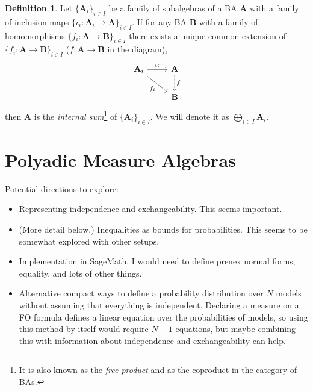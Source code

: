 \documentclass{article}
\theoremstyle{definition}
\newtheorem{definition}{Definition}
\theoremstyle{remark}
\begin{document}
\begin{definition}
  Let $\{ \mathbf{A}_i \}_{i \in I}$ be a family of subalgebras of a BA
  $\mathbf{A}$ with a family of inclusion maps $\{ \iota_i\colon \mathbf{A}_i
  \to \mathbf{A} \}_{i \in I}$. If for any BA $\mathbf{B}$ with a family of
  homomorphisms $\{ f_i\colon \mathbf{A} \to \mathbf{B} \}_{i \in I}$ there
  exists a unique common extension of $\{ f_i\colon \mathbf{A} \to \mathbf{B}
  \}_{i \in I}$ ($f\colon \mathbf{A} \to \mathbf{B}$ in the diagram),
  \[
    \begin{tikzcd}
      \mathbf{A}_i \arrow{r}{\iota_i} \arrow{rd}[swap]{f_i} & \mathbf{A} \arrow[d,dashed,"f"] \\
      & \mathbf{B}
    \end{tikzcd}
  \]
  then $\mathbf{A}$ is the \emph{internal sum}\footnote{It is also known as the
    \emph{free product} and as the coproduct in the category of BAs.} of $\{
  \mathbf{A}_i \}_{i \in I}$. We will denote it as $\bigoplus_{i \in I}
  \mathbf{A}_i$.
\end{definition}

\section{Polyadic Measure Algebras}

Potential directions to explore:
\begin{itemize}
\item Representing independence and exchangeability. This seems important.
\item (More detail below.) Inequalities as bounds for probabilities. This seems
  to be somewhat explored with other setups.
\item Implementation in SageMath. I would need to define prenex normal forms,
  equality, and lots of other things.
\item Alternative compact ways to define a probability distribution over $N$
  models without assuming that everything is independent. Declaring a measure on
  a FO formula defines a linear equation over the probabilities of models, so
  using this method by itself would require $N-1$ equations, but maybe combining
  this with information about independence and exchangeability can help.
\end{itemize}

\end{document}
